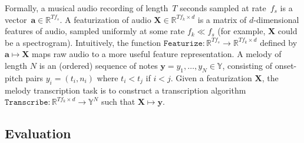 Formally, a musical audio recording of length~$T$ seconds sampled at rate~$f_s$ is a vector~${\bm{a} \in \mathbb{R}^{Tf_s}}$.
A featurization of audio ${\bm{X} \in \mathbb{R}^{Tf_k \times d}}$ is a matrix of $d$-dimensional features of audio, sampled uniformly at some rate ${f_k \ll f_s}$ (for example, $\bm{X}$ could be a spectrogram).
Intuitively, the function $\texttt{Featurize} : \mathbb{R}^{Tf_s} \to \mathbb{R}^{Tf_k \times d}$ defined by $\bm{a} \mapsto \bm{X}$ maps 
raw audio 
to a more useful feature representation.
A melody of length $N$ is an (ordered) sequence of notes 
$\bm{y} = y_1,\dots,y_N \in \mathbb{Y}$, 
consisting of onset-pitch pairs $y_i = (t_i,n_i)$ where $t_i < t_j$ if $i < j$. Given a featurization $\bm{X}$, the melody transcription task is to construct a transcription algorithm $\texttt{Transcribe} : \mathbb{R}^{Tf_k \times d} \to \mathbb{Y}^N$ such that ${\bm{X} \mapsto \bm{y}}$.




\subsection{Evaluation}
\label{sec:eval}


